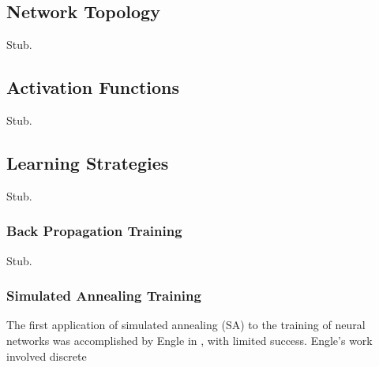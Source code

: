 \documentclass[11pt]{afthesis}
\begin{document}
	
	
	
	
	\subsection{Network Topology}
	
	Stub.
	
	\subsection{Activation Functions}
	
	Stub.
	
	\subsection{Learning Strategies}
	
	Stub.
	
	
	
	
	\subsubsection{Back Propagation Training} \label{sec:backpropTraining}
	Stub.
	
	
	
	
	
	
	
	\subsubsection{Simulated Annealing Training} 
	
	
	The first application of simulated annealing (SA) to the training of neural networks was accomplished by Engle in \cite{engel1988teachingfeedforwardnueralnetsbysa}, with limited success. Engle's work involved discrete
	
\end{document}
